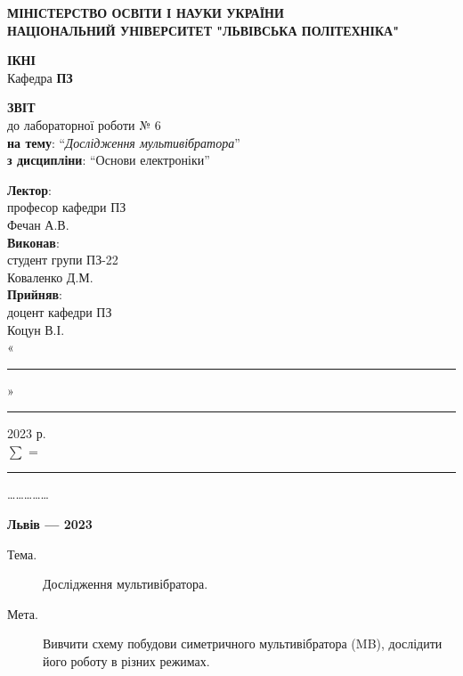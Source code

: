 \documentclass{article}
\newcommand\subject{Основи електроніки}
\newcommand\lecturer{професор кафедри ПЗ \\ Фечан А.В.}
\newcommand\teacher{доцент кафедри ПЗ \\ Коцун В.І.}
\newcommand\mygroup{ПЗ-22}
\newcommand\lab{6}
\newcommand\theme{Дослідження мультивібратора}
\newcommand\purpose{Вивчити схему побудови симетричного мультивібратора
	(MB), дослідити його роботу в різних режимах}
\begin{document}
\begin{normalsize}
	\begin{titlepage}
		\thispagestyle{empty}
		\begin{center}
			\textbf{МІНІСТЕРСТВО ОСВІТИ І НАУКИ УКРАЇНИ\\
				НАЦІОНАЛЬНИЙ УНІВЕРСИТЕТ "ЛЬВІВСЬКА ПОЛІТЕХНІКА"}
		\end{center}
		\begin{flushright}
			\textbf{ІКНІ}\\
			Кафедра \textbf{ПЗ}
		\end{flushright}
		\vspace{200pt}
		\begin{center}
			\textbf{ЗВІТ}\\
			\vspace{10pt}
			до лабораторної роботи № \lab\\
			\textbf{на тему}: “\textit{\theme}”\\
			\textbf{з дисципліни}: “\subject”
		\end{center}
		\vspace{112pt}
		\begin{flushright}
			
			\textbf{Лектор}:\\
			\lecturer\\
			\vspace{28pt}
			\textbf{Виконав}:\\
			
			студент групи \mygroup\\
			Коваленко Д.М.\\
			\vspace{28pt}
			\textbf{Прийняв}:\\
			
			\teacher\\
			
			\vspace{28pt}
			«\rule{1cm}{0.15mm}» \rule{1.5cm}{0.15mm} 2023 р.\\
			$\sum$ = \rule{1cm}{0.15mm}……………\\
			
		\end{flushright}
		\vspace{\fill}
		\begin{center}
			\textbf{Львів — 2023}
		\end{center}
	\end{titlepage}
		
	\begin{description}
		\item[Тема.] \theme.
		\item[Мета.] \purpose.
	\end{description}


\end{normalsize}
\end{document}
